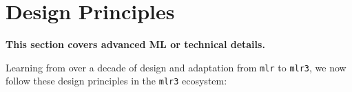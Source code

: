 \hypertarget{design-principles}{%
\section{Design Principles}\label{design-principles}}

\begin{tcolorbox}[enhanced jigsaw, colframe=quarto-callout-note-color-frame, rightrule=.15mm, bottomrule=.15mm, toprule=.15mm, opacityback=0, colback=white, left=2mm, arc=.35mm, breakable, leftrule=.75mm]
\begin{minipage}[t]{5.5mm}
\textcolor{quarto-callout-note-color}{\faInfo}
\end{minipage}%
\begin{minipage}[t]{\textwidth - 5.5mm}

\textbf{This section covers advanced ML or technical
details.}\vspace{2mm}

\end{minipage}%
\end{tcolorbox}

Learning from over a decade of design and adaptation from \texttt{mlr} to \texttt{mlr3}, we now follow these design principles in the
\texttt{mlr3} ecosystem:

